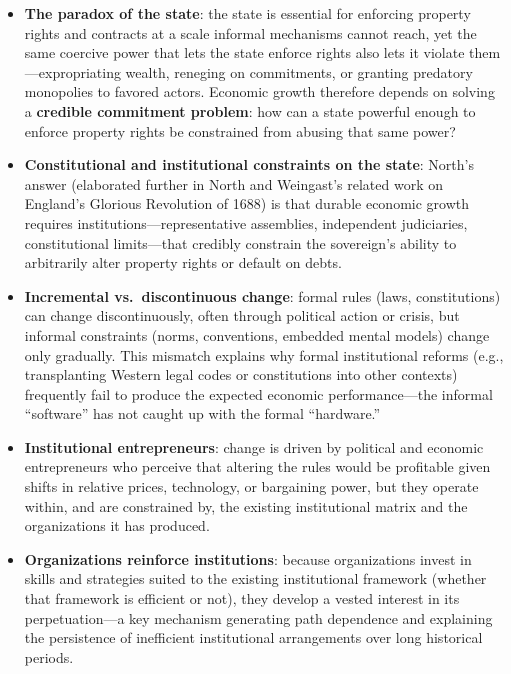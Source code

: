 \documentclass[12pt]{article}
\begin{document}
\begin{itemize}[leftmargin=*, itemsep=4pt]
    \item \textbf{The paradox of the state}: the state is essential for enforcing property rights and contracts at a scale informal mechanisms cannot reach, yet the same coercive power that lets the state enforce rights also lets it violate them---expropriating wealth, reneging on commitments, or granting predatory monopolies to favored actors. Economic growth therefore depends on solving a \textbf{credible commitment problem}: how can a state powerful enough to enforce property rights be constrained from abusing that same power?
    \item \textbf{Constitutional and institutional constraints on the state}: North's answer (elaborated further in North and Weingast's related work on England's Glorious Revolution of 1688) is that durable economic growth requires institutions---representative assemblies, independent judiciaries, constitutional limits---that credibly constrain the sovereign's ability to arbitrarily alter property rights or default on debts.
    \item \textbf{Incremental vs.\ discontinuous change}: formal rules (laws, constitutions) can change discontinuously, often through political action or crisis, but informal constraints (norms, conventions, embedded mental models) change only gradually. This mismatch explains why formal institutional reforms (e.g., transplanting Western legal codes or constitutions into other contexts) frequently fail to produce the expected economic performance---the informal ``software'' has not caught up with the formal ``hardware.''
    \item \textbf{Institutional entrepreneurs}: change is driven by political and economic entrepreneurs who perceive that altering the rules would be profitable given shifts in relative prices, technology, or bargaining power, but they operate within, and are constrained by, the existing institutional matrix and the organizations it has produced.
    \item \textbf{Organizations reinforce institutions}: because organizations invest in skills and strategies suited to the existing institutional framework (whether that framework is efficient or not), they develop a vested interest in its perpetuation---a key mechanism generating path dependence and explaining the persistence of inefficient institutional arrangements over long historical periods.
\end{itemize}
\end{document}
